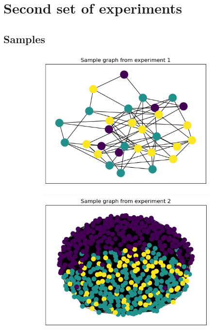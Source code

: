 \documentclass[switch, 12pt]{article}
\begin{document}
\newpage

\section{Second set of experiments}
\label{app:sbm}

\subsection{Samples}

\hphantom{.}  %

\begin{figure}[h]
    \hfill
    \centering
    \begin{subfigure}{0.28\linewidth}
        \centering
        \includegraphics[width=\linewidth]{figures/exp1_sample.png}
    \end{subfigure}
    \hfill
    \begin{subfigure}{0.28\linewidth}
        \centering
        \includegraphics[width=\linewidth]{figures/exp2_sample.png}

\end{subfigure}
\end{figure}
\end{document}
